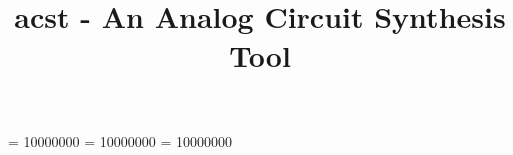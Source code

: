 \documentclass[msc,oneside]{eda_thesis}
\begin{document}
\title{acst - An Analog Circuit Synthesis Tool}
\address{inga.abel@tum.de}

\maketitle

%

\tableofcontents
\widowpenalty = 10000000
\clubpenalty = 10000000
\displaywidowpenalty = 10000000

\pagebreak






\pagebreak
\newpage


\end{document}
